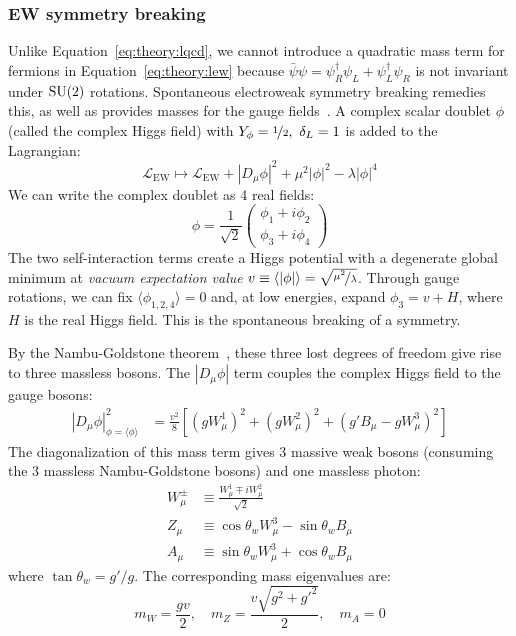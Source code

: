 \subsubsection{EW symmetry breaking}
Unlike Equation~\ref{eq:theory:lqcd}, we cannot introduce a quadratic mass term for fermions in Equation~\ref{eq:theory:lew} because $\bar\psi \psi = \psi^\dag_R\psi_L + \psi^\dag_L\psi_R$ is not invariant under $\operatorname{\mathrm{SU}}(2)$ rotations.
Spontaneous electroweak symmetry breaking remedies this, as well as provides masses for the gauge fields~\cite{ewsb1,ewsb2,ewsb3,ewsb4,ewsb5,ewsb6}.
A complex scalar doublet $\phi$ (called the complex Higgs field) with $Y_\phi=\nicefrac{1}{2},~\delta_L=1$ is added to the Lagrangian:
\begin{equation}
    \mathcal{L}_\mathrm{EW} \mapsto \mathcal{L}_\mathrm{EW}
            + |D_\mu \phi|^2 + \mu^2|\phi|^2 - \lambda |\phi|^4
    \label{eq:theory:lhiggs}
\end{equation}
We can write the complex doublet as 4 real fields:
\begin{equation}
    \phi = \frac{1}{\sqrt{2}} \left(\begin{matrix} \phi_1 + i\phi_2 \\ \phi_3 + i \phi_4 \end{matrix} \right)
\end{equation}
The two self-interaction terms create a Higgs potential with a degenerate global minimum at \emph{vacuum expectation value} $v \equiv \langle |\phi| \rangle = \sqrt{\nicefrac{\mu^2}{\lambda}}$.
Through gauge rotations, we can fix $\langle\phi_{1,2,4}\rangle = 0$ and, at low energies, expand $\phi_3 = v + H$, where $H$ is the real Higgs field. 
This is the spontaneous breaking of a symmetry.

By the Nambu-Goldstone theorem~\cite{nambu,goldstone}, these three lost degrees of freedom give rise to three massless bosons. 
The $|D_\mu \phi|$ term couples the complex Higgs field to the gauge bosons:
\begin{align}
    |D_\mu \phi|^2_{\phi = \langle\phi\rangle} &= 
        \frac{v^2}{8} \left[(gW_\mu^1)^2 + (gW^2_\mu)^2 + (g'B_\mu - gW_\mu^3)^2\right] 
\end{align}
The diagonalization of this mass term gives 3 massive weak bosons (consuming the 3 massless Nambu-Goldstone bosons) and one massless photon:
\begin{align}
    W^\pm_\mu &\equiv \frac{W_\mu^1 \mp iW_\mu^2}{\sqrt{2}} \nonumber \\ 
    Z_\mu &\equiv \cos\theta_w W_\mu^3 - \sin\theta_w B_\mu \nonumber \\ 
    A_\mu &\equiv \sin\theta_w W_\mu^3 + \cos\theta_w B_\mu
\end{align}
where $\tan\theta_w = g'/g$.
The corresponding mass eigenvalues are:
\begin{equation}
    m_W = \frac{gv}{2}, \quad m_Z = \frac{v\sqrt{g^2+g'^2}}{2}, \quad m_A = 0
\end{equation}

